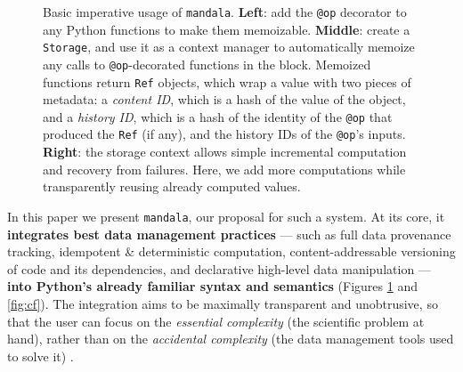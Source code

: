 \documentclass{article} %
\begin{document}
\begin{figure}[h]
\begin{subfigure}{0.4\textwidth}
\end{subfigure}
\caption{Basic imperative usage of \texttt{mandala}. \textbf{Left}: add the \texttt{@op}
decorator to any Python functions to make them memoizable. \textbf{Middle}:
create a \texttt{Storage}, and use it as a context manager to automatically
memoize any calls to \texttt{@op}-decorated functions in the block. Memoized
functions return \texttt{Ref} objects, which wrap a value with two pieces of
metadata: a \emph{content ID}, which is a hash of the value of the
object, and a \emph{history ID}, which is a hash of the identity of the
\texttt{@op} that produced the \texttt{Ref} (if any), and the history IDs of the
\texttt{@op}'s inputs. \textbf{Right}: the storage context allows simple
incremental computation and recovery from failures. Here, we add more
computations while transparently reusing already computed values.}
\label{fig:basic-usage}
\end{figure}

In this paper we present \texttt{mandala}, our proposal for such a system. At
its core, it \textbf{integrates best data management practices} --- such as full
data provenance tracking, idempotent \& deterministic computation,
content-addressable versioning of code and its dependencies, and declarative
high-level data manipulation --- \textbf{into Python's already familiar syntax
and semantics} (Figures \ref{fig:basic-usage} and \ref{fig:cf}). The integration aims to be
maximally transparent and unobtrusive, so that the user can focus on the
\emph{essential complexity} (the scientific problem at hand), rather than on the
\emph{accidental complexity} (the data management tools used to solve it)
\citep{Brooks1987NoSB}.
\end{document}
